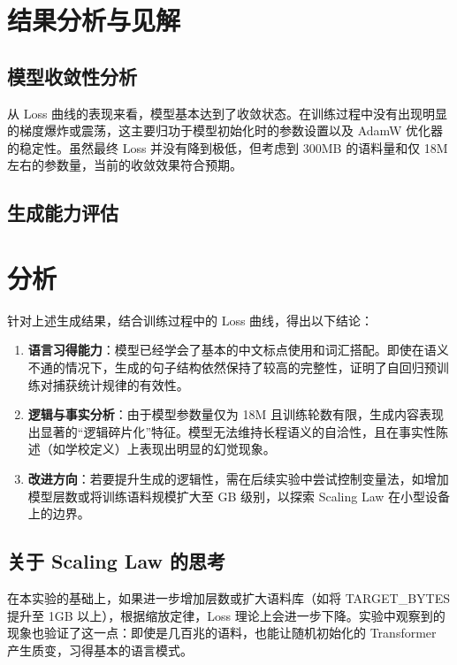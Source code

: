 \documentclass[a4paper,12pt]{ctexart} %
\begin{document}
\section{结果分析与见解}

\subsection{模型收敛性分析}
从 Loss 曲线的表现来看，模型基本达到了收敛状态。在训练过程中没有出现明显的梯度爆炸或震荡，这主要归功于模型初始化时的参数设置以及 AdamW 优化器的稳定性。虽然最终 Loss 并没有降到极低，但考虑到 300MB 的语料量和仅 18M 左右的参数量，当前的收敛效果符合预期。

\subsection{生成能力评估}
\section{分析}
针对上述生成结果，结合训练过程中的 Loss 曲线，得出以下结论：
\begin{enumerate}
    \item \textbf{语言习得能力}：模型已经学会了基本的中文标点使用和词汇搭配。即使在语义不通的情况下，生成的句子结构依然保持了较高的完整性，证明了自回归预训练对捕获统计规律的有效性。
    \item \textbf{逻辑与事实分析}：由于模型参数量仅为 18M 且训练轮数有限，生成内容表现出显著的“逻辑碎片化”特征。模型无法维持长程语义的自洽性，且在事实性陈述（如学校定义）上表现出明显的幻觉现象。
    \item \textbf{改进方向}：若要提升生成的逻辑性，需在后续实验中尝试控制变量法，如增加模型层数或将训练语料规模扩大至 GB 级别，以探索 Scaling Law 在小型设备上的边界。
\end{enumerate}
\subsection{关于 Scaling Law 的思考}
在本实验的基础上，如果进一步增加层数或扩大语料库（如将 TARGET\_BYTES 提升至 1GB 以上），根据缩放定律，Loss 理论上会进一步下降。实验中观察到的现象也验证了这一点：即使是几百兆的语料，也能让随机初始化的 Transformer 产生质变，习得基本的语言模式。
\end{document}
